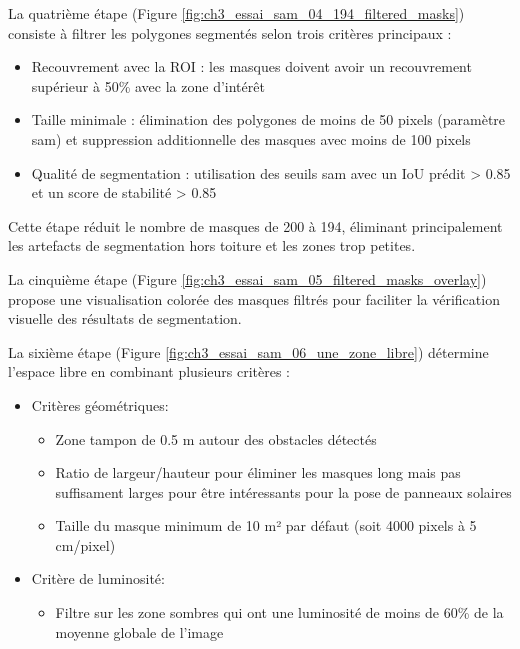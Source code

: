 La quatrième étape (Figure \ref{fig:ch3_essai_sam_04_194_filtered_masks}) consiste à filtrer les polygones segmentés selon trois critères principaux :
\begin{itemize}
    \item Recouvrement avec la ROI : les masques doivent avoir un recouvrement supérieur à 50\% avec la zone d'intérêt
    \item Taille minimale : élimination des polygones de moins de 50 pixels (paramètre \acrshort{sam}) et suppression additionnelle des masques avec moins de 100 pixels
    \item Qualité de segmentation : utilisation des seuils \acrshort{sam} avec un IoU prédit > 0.85 et un score de stabilité > 0.85
\end{itemize}
Cette étape réduit le nombre de masques de 200 à 194, éliminant principalement les artefacts de segmentation hors toiture et les zones trop petites.

La cinquième étape (Figure \ref{fig:ch3_essai_sam_05_filtered_masks_overlay}) propose une visualisation colorée des masques filtrés pour faciliter la vérification visuelle des résultats de segmentation.

La sixième étape (Figure \ref{fig:ch3_essai_sam_06_une_zone_libre}) détermine l'espace libre en combinant plusieurs critères :

\begin{itemize}
    \item Critères géométriques:
    \begin{itemize}
        \item Zone tampon de 0.5 m autour des obstacles détectés
        \item Ratio de largeur/hauteur pour éliminer les masques long mais pas suffisament larges pour être intéressants pour la pose de panneaux solaires
        \item Taille du masque minimum de 10 m² par défaut (soit 4000 pixels à 5 cm/pixel)
    \end{itemize}
    \item Critère de luminosité:
        \begin{itemize}
            \item Filtre sur les zone sombres qui ont une luminosité de moins de 60\% de la moyenne globale de l'image
        \end{itemize}
\end{itemize}

